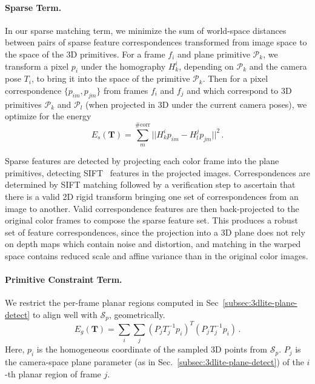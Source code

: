 \paragraph*{Sparse Term.}
In our sparse matching term, we minimize the sum of world-space distances between pairs of sparse feature correspondences transformed from image space to the space of the 3D primitives. 
For a frame $f_i$ and plane primitive $\mathcal{P}_k$, we transform a pixel $p_i$ under the homography $H_k^i$, depending on $\mathcal{P}_k$ and the camera pose $T_i$, to bring it into the space of the primitive $\mathcal{P}_k$.
Then for a pixel correspondence $\{p_{im},p_{jm}\}$ from frames $f_i$ and $f_j$ and which correspond to 3D primitives $\mathcal{P}_k$ and $\mathcal{P}_l$ (when projected in 3D under the current camera poses), we optimize for the energy
\begin{equation}
E_s(\mathbf{T}) = \sum_m^{\#\textrm{corr}} ||H_k^ip_{im} - H_l^j p_{jm}||^2\,.
\label{eq:pose-optim-sparse}
\end{equation}

Sparse features are detected by projecting each color frame into the plane primitives, detecting SIFT~\cite{lowe2004distinctive} features in the projected images.
Correspondences are determined by SIFT matching followed by a verification step to ascertain that there is a valid 2D rigid transform bringing one set of correspondences from an image to another.
Valid correspondence features are then back-projected to the original color frames to compose the sparse feature set. 
This produces a robust set of feature correspondences, since the projection into a 3D plane does not rely on depth maps which contain noise and distortion, and matching in the warped space contains reduced scale and affine variance than in the original color images.

\paragraph*{Primitive Constraint Term.}
We restrict the per-frame planar regions computed in Sec~\ref{subsec:3dlite-plane-detect} to align well with $\mathcal{S}_p$, geometrically.
\begin{equation}
E_g(\mathbf{T}) = \sum_{i} \sum_{j} (P_j T_j^{-1} p_i)^T (P_j T_j^{-1} p_i)\,.
\label{eq:pose-optim-geo}
\end{equation}
Here, $p_i$ is the homogeneous coordinate of the sampled 3D points from $\mathcal{S}_p$. $P_j$ is the camera-space plane parameter (as in Sec.~\ref{subsec:3dlite-plane-detect}) of the $i$-th planar region of frame $j$.

